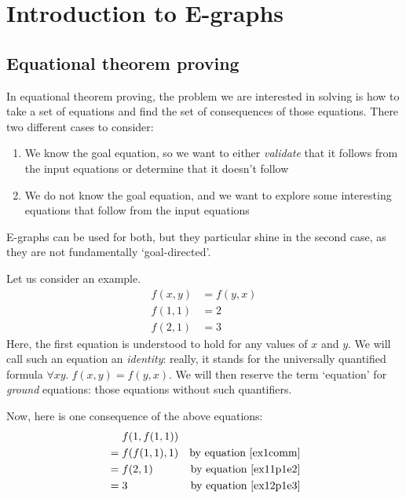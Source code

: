 \documentclass[12pt,a4paper,twoside,openright]{report}
\numberwithin{equation}{chapter}		%
\numberwithin{figure}{chapter}			%
\numberwithin{table}{chapter}			%
\theoremstyle{definition}
\theoremstyle{plain}
\begin{document}
\cleardoublepage
\setcounter{page}{1}


\chapter{Introduction to E-graphs}
\section{Equational theorem proving}
In equational theorem proving, the problem we are interested in solving is how to take a set of equations and find the set of consequences of those equations. There two different cases to consider:
\begin{enumerate}
\item We know the goal equation, so we want to either \emph{validate} that it follows from the input equations or determine that it doesn't follow
\item We do not know the goal equation, and we want to explore some interesting equations that follow from the input equations
\end{enumerate}

E-graphs can be used for both, but they particular shine in the second case, as they are not fundamentally `goal-directed'.

Let us consider an example.
\begin{align}
	\label{ex1comm} f(x, y) &= f(y, x) \\
	\label{ex11p1e2} f(1, 1) &= 2 \\
	\label{ex12p1e3} f(2, 1) &= 3
\end{align}
Here, the first equation is understood to hold for any values of $x$ and $y$. We will call such an equation an \emph{identity}: really, it stands for the universally quantified formula $\forall x y.\; f(x, y) = f(y, x)$. We will then reserve the term `equation' for \emph{ground} equations: those equations without such quantifiers.

Now, here is one consequence of the above equations:
\begin{align*}
	&\mathrel{\hphantom{=}} f(1, f(1, 1)) \\
	&= f(f(1, 1), 1) &\textrm{by equation \ref{ex1comm}} \\
	&= f(2, 1) &\textrm{by equation \ref{ex11p1e2}} \\
	&= 3 &\textrm{by equation \ref{ex12p1e3}}
\end{align*}
\end{document}
